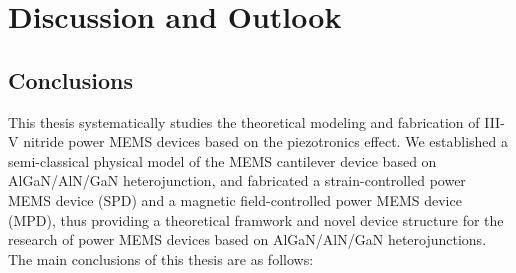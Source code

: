 \chapter{Discussion and Outlook}
\label{ch:Discussion and Outlook}

\ifpdf
    \graphicspath{{Chapter5/Figs/Raster/}{Chapter5/Figs/PDF/}{Chapter5/Figs/}}
\else
    \graphicspath{{Chapter5/Figs/Vector/}{Chapter5/Figs/}}
\fi


\section{Conclusions}

This thesis systematically studies the theoretical modeling and fabrication of III-V nitride power MEMS devices based on the piezotronics  effect. We established a semi-classical physical model of the MEMS cantilever  device based on AlGaN/AlN/GaN heterojunction, and fabricated a strain-controlled power MEMS device (SPD) and a magnetic field-controlled power MEMS device (MPD), thus providing a theoretical framwork and novel device structure for the research of power MEMS devices based on AlGaN/AlN/GaN heterojunctions. The main conclusions of this thesis are as follows:

